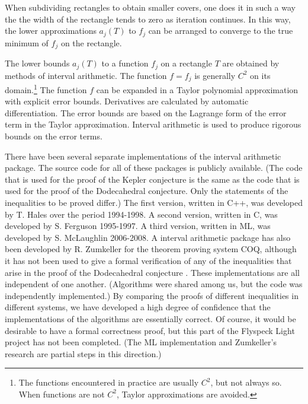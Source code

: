 \documentclass{article} %
\begin{document}
When subdividing rectangles to obtain smaller covers, one does
it in such a way the the width of the rectangle tends to zero
as iteration continues.
In this way,  the lower approximations 
$a_j(T)$ to $f_j$ can be arranged to converge to the true minimum of $f_j$ on the
rectangle.

The lower bounds $a_j(T)$ to a function $f_j$ on a rectangle $T$
are obtained by methods of interval arithmetic.  The function
$f=f_j$ is generally $C^2$ on its domain.\footnote{The functions
 encountered in practice are usually $C^2$, but not always so.  When functions are not
$C^2$,  Taylor approximations are avoided.}  
The function $f$ can be expanded in a Taylor polynomial approximation with
explicit error bounds.  Derivatives are calculated by automatic
differentiation.  The error bounds are based on the Lagrange form of
the error term in the Taylor approximation.  Interval arithmetic is used to produce rigorous bounds on the error terms.


There have been several separate implementations of the interval
arithmetic package.  
The source code for all of these packages
is publicly available. (The code that is used for the proof of 
the Kepler conjecture is the same as the code that is used for
the proof of the Dodecahedral conjecture.  Only the statements
of the inequalities to be proved differ.) 
The first version, written in C++, 
was developed by T. Hales
over the period 1994-1998.  
A second version, written in C, was developed by S. Ferguson 
1995-1997.  A third version, written in ML, was developed by S. McLaughlin 2006-2008.  A interval arithmetic package has also been developed
by R. Zumkeller for the theorem proving system COQ, although it has not  been used to give a formal verification of any of the inequalities that arise in the proof of the Dodecahedral conjecture \cite{Zu}.
These implementations are all independent of one another. (Algorithms
were shared among us, but the code was independently implemented.) 
By comparing the proofs of different inequalities in different 
systems, we have developed 
a high degree of confidence that the implementations
of the algorithms are essentially correct.  Of course, it would
be desirable to have a formal correctness proof, but this part
of the Flyspeck Light project has not been completed.  (The ML
implementation and Zumkeller's research are partial steps
in this direction.)
\end{document}
